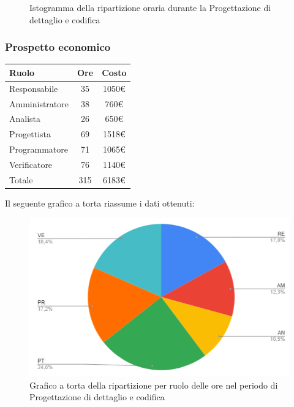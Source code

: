 {{{{{{{{{{{{{{{{\begin{figure}[!h]
\begin{center}
						\caption{Istogramma della ripartizione oraria durante la Progettazione di
							dettaglio e codifica}
					\end{center}
				\end{figure}
				\clearpage
				\subsubsection{Prospetto economico}\label{PreventivoFaseDiProgettazioneDiDettaglioECodificaProspettoEconomico}
				\quad
				\def\tabularxcolumn#1{m{#1}}
				{
					\begin{center}
						\renewcommand{\arraystretch}{1.4}
						\begin{tabularx}{7cm}{|X|c|c|}
							\hline
							\rowcolor{airforceblue}
							\textbf{Ruolo} & \textbf{Ore} & \textbf{Costo}\\
							\hline
							Responsabile & 35 & 1050\euro\\
							\hline
							Amministratore & 38 & 760\euro\\
							\hline
							Analista & 26 & 650\euro\\
							\hline
							Progettista & 69 & 1518\euro\\
							\hline
							Programmatore & 71 & 1065\euro\\
							\hline
							Verificatore & 76 & 1140\euro\\
							\hline
							Totale & 315 & 6183\euro\\
							\hline
						\end{tabularx}
					\end{center}
					
					Il seguente grafico a torta riassume i dati ottenuti:
					\begin{figure}[!ht]
						\begin{center}
							\includegraphics[width=0.8\linewidth]{../immagini/pdp/torta_progettazione_dettaglio.png}
							\caption{Grafico a torta della ripartizione per ruolo delle ore nel periodo di Progettazione
								di dettaglio e codifica}
						\end{center}
					\end{figure}

}}}}}}}}}}}}}}}}}
